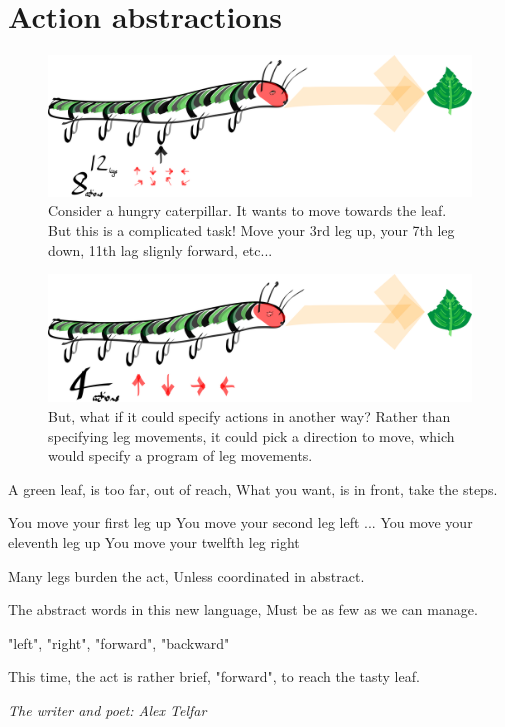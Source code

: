 \section{Action abstractions}

\begin{figure}
\centering
\includegraphics[width=\textwidth,height=0.25\textheight]{../../pictures/drawings/hungry-caterpillar.png}
\caption{Consider a hungry caterpillar. It wants to move towards the leaf. But this is a complicated task! Move your 3rd leg up, your 7th leg down, 11th lag slignly forward, etc...}
\end{figure}


\begin{figure}
\centering
\includegraphics[width=\textwidth,height=0.25\textheight]{../../pictures/drawings/full-caterpillar.png}
\caption{But, what if it could specify actions in another way? Rather than specifying leg movements, it could pick a direction to move, which would specify a program of leg movements.}
\end{figure}

\epigraph{
A green leaf, is too far, out of reach,
What you want, is in front, take the steps.

You move your first leg up You move your second leg left ... You move your eleventh leg up You move your twelfth leg right

Many legs burden the act,
Unless coordinated in abstract.

The abstract words in this new language,
Must be as few as we can manage.

"left", "right", "forward", "backward"

This time, the act is rather brief,
"forward", to reach the tasty leaf.
}{\textit{The writer and poet: Alex Telfar}}
